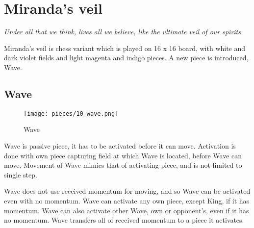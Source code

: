 

\chapter*{Miranda's veil}
\label{ch:Miranda's veil}

\begin{flushright}
\parbox{0.8\textwidth}{
\emph{Under all that we think, lives all we believe, like the ultimate veil of our spirits. \newline
{} } }
\end{flushright}

\noindent
Miranda's veil is chess variant which is played on 16 x 16 board, with
white and dark violet fields and light magenta and indigo pieces.
A new piece is introduced, Wave.

\clearpage %

\section*{Wave}
\label{sec:Miranda's veil/Wave}

\vspace*{-1.4\baselineskip}
\noindent
\begin{wrapfigure}[12]{l}{0.4\textwidth}
\centering
\texttt{[image: pieces/10\_wave.png]}
\caption{Wave}
\label{fig:10_wave}
\end{wrapfigure}
Wave is passive piece, it has to be activated before it can move. Activation is done
with own piece capturing field at which Wave is located, before Wave can move.
Movement of Wave mimics that of activating piece, and is not limited to single step.

Wave does not use received momentum for moving, and so Wave can be activated even
with no momentum. Wave can activate any own piece, except King, if it has momentum.
Wave can also activate other Wave, own or opponent's, even if it has no momentum.
Wave transfers all of received momentum to a piece it activates.


